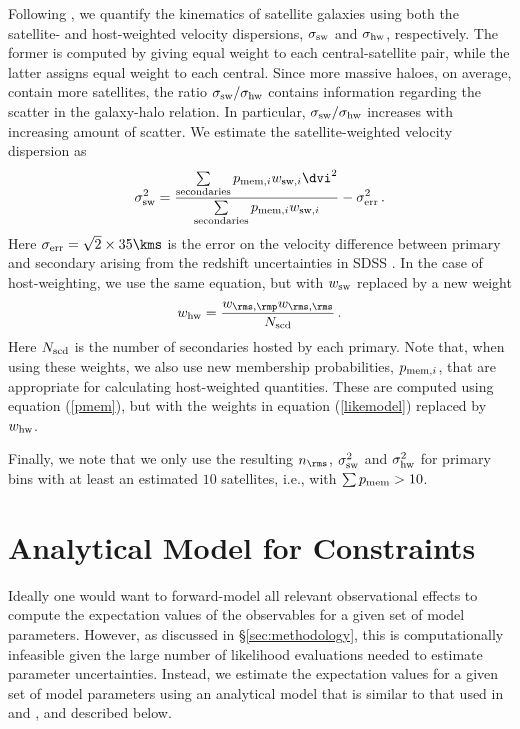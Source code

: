 \documentclass[fleqn,usenatbib,useAMS]{mnras}
\begin{document}
	Following \cite{More+09a}, we quantify the kinematics of satellite galaxies using both the satellite- and host-weighted velocity dispersions, $\sigma_{\rm sw}$ and $\sigma_{\rm hw}$, respectively. The former is computed by giving equal weight to each central-satellite pair, while the latter assigns equal weight to each central.  Since more massive haloes, on average, contain more satellites, the ratio $\sigma_{\rm sw}/\sigma_{\rm hw}$ contains information regarding the scatter in the galaxy-halo relation. In particular, $\sigma_{\rm sw}/\sigma_{\rm hw}$ increases with increasing amount of scatter. We estimate the satellite-weighted velocity dispersion as
	\begin{equation}
	\sigma_{\rm sw}^2 = \frac{\sum\limits_{\rm secondaries} p_{\mathrm{mem}, i} w_{\mathrm{sw}, i} \dvi^2}{\sum\limits_{\rm secondaries} p_{\mathrm{mem}, i} w_{\mathrm{sw}, i}} - \sigma^2_{\rm err}\,.
	\label{eq:sigma_sw}
	\end{equation}
	Here $\sigma_{\rm err} = \sqrt{2} \times 35 \kms$ is the error on the velocity difference between primary and secondary arising from the redshift uncertainties in SDSS \citep[e.g.,][]{More+09b}.
	In the case of host-weighting, we use the same equation, but with $w_{\rm sw}$  replaced by
	a new weight
	\begin{equation}
	w_{\rm hw} = \frac{w_{\rms, \rmp} w_{\rm \rms, \rms}}{N_{\rm scd}}\,.
	\end{equation}
	Here $N_{\rm scd}$ is the number of secondaries hosted by each primary. Note that, when using these weights, we also use new membership probabilities, $p_{{\rm mem}, i}$, that are appropriate for calculating host-weighted quantities. These are computed using equation (\ref{pmem}), but with the weights in equation (\ref{likemodel}) replaced by $w_{\rm hw}$.
	
	Finally, we note that we only use the resulting $n_\rms$, $\sigma_{\rm sw}^2$ and $\sigma_{\rm hw}^2$ for primary bins with at least an estimated $10$ satellites, i.e., with $\sum p_{\rm mem} > 10$.
	
	\section{Analytical Model for Constraints}
	\label{sec:model}
	
	Ideally one would want to forward-model all relevant observational effects to compute the expectation values of the observables for a given set of model parameters. However, as discussed in \S\ref{sec:methodology}, this is computationally infeasible given the large number of likelihood evaluations needed to estimate parameter uncertainties. Instead, we estimate the expectation values for a given set of model parameters using an analytical model that is similar to that used in \cite{vdBosch+04} and \cite{More+09a, More+09b, More+11}, and described below.
	
\end{document}
